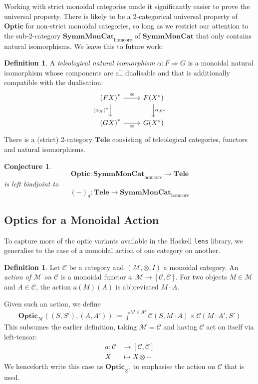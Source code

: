 \documentclass[11pt,letterpaper]{article}
\theoremstyle{plain}
\newtheorem{conjecture}[theorem]{Conjecture}
\theoremstyle{definition}
\newtheorem{definition}[theorem]{Definition}
\newcommand{\C}{\mathscr{C}}
\newcommand{\M}{\mathscr{M}}
\newcommand{\lenslib}{\texttt{lens}}
\newcommand{\SymmMonCat}{\mathbf{SymmMonCat}}
\newcommand{\Tele}{\mathbf{Tele}}
\newcommand{\Optic}{\mathbf{Optic}}
\newcommand{\act}{\cdot}
\begin{document}
Working with strict monoidal categories made it significantly easier to prove the universal property. There is likely to be a 2-categorical universal property of $\Optic$ for non-strict monoidal categories, so long as we restrict our attention to the sub-2-category $\SymmMonCat_\mathrm{homcore}$ of $\SymmMonCat$ that only contains natural isomorphisms. We leave this to future work:

\begin{definition}
  A \emph{teleological natural isomorphism} $\alpha : F \Rightarrow G$ is a monoidal natural isomorphism whose components are all dualisable and that is additionally compatible with the dualisation:
  \[
  \begin{tikzcd}
    {(FX)}^* \ar[r, "\cong"]  \ar[d, "(\alpha_X)^*", swap] & F(X^*) \ar[d, "\alpha_{X^*}"] \\
    {(GX)}^* \ar[r, "\cong", swap] & G(X^*)
  \end{tikzcd}
  \]
  There is a (strict) 2-category $\Tele$ consisting of teleological categories, functors and natural isomorphisms.
\end{definition}

\begin{conjecture}
\[ \Optic : \SymmMonCat_\mathrm{homcore} \to \Tele \] is left biadjoint to \[(-)_d : \Tele \to \SymmMonCat_\mathrm{homcore}\]
\end{conjecture}


\subsection{Optics for a Monoidal Action}

To capture more of the optic variants available in the Haskell \lenslib{} library, we generalise to the case of a monoidal action of one category on another.

\begin{definition}
  Let $\C$ be a category and $(\M, \otimes, I)$ a monoidal category. An \emph{action of $\M$ on $\C$} is a monoidal functor $a : \M \to [\C, \C]$. For two objects $M \in \M$ and $A \in \C$, the action $a(M)(A)$ is abbreviated $M \act A$. 
\end{definition}

Given such an action, we define
\begin{align*}
  \Optic_\M((S, S'), (A, A')) := \int^{M \in \M} \C(S, M \act A) \times \C(M \act A', S')
\end{align*}
This subsumes the earlier definition, taking $\M = \C$ and having $\C$ act on itself via left-tensor:
\begin{align*}
a : \C &\to [\C, \C] \\
X &\mapsto X \otimes -
\end{align*}
We henceforth write this case as $\Optic_\otimes$, to emphasise the action on $\C$ that is used.
\end{document}
